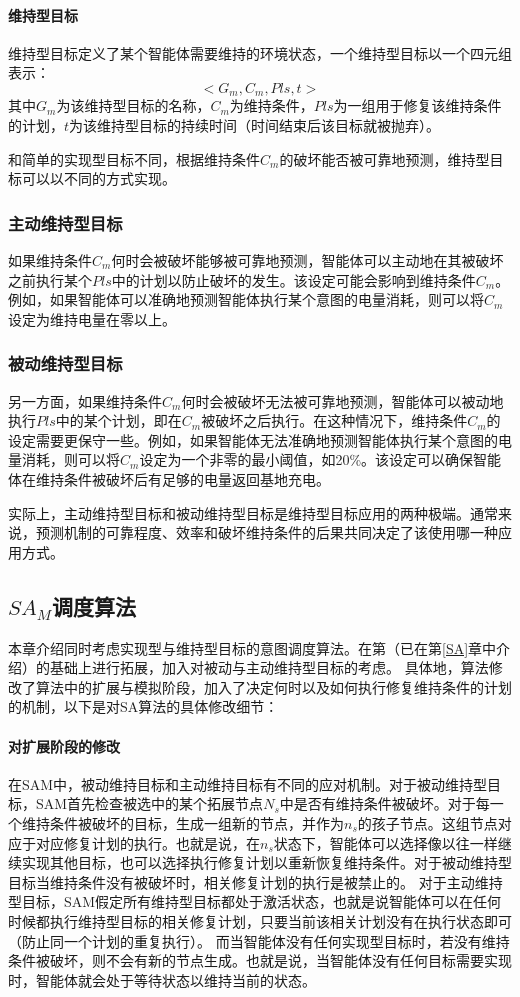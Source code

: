 \paragraph{维持型目标}
维持型目标定义了某个智能体需要维持的环境状态\cite{DBLP:journals/ci/DuffTH14}，一个维持型目标以一个四元组表示：
$$<G_m,C_m,Pls,t>$$
其中$G_m$为该维持型目标的名称，$C_m$为维持条件，$Pls$为一组用于修复该维持条件的计划，$t$为该维持型目标的持续时间（时间结束后该目标就被抛弃）。

和简单的实现型目标不同，根据维持条件$C_m$的破坏能否被可靠地预测，维持型目标可以以不同的方式实现。
\subsubsection{主动维持型目标}
如果维持条件$C_m$何时会被破坏能够被可靠地预测，智能体可以主动地在其被破坏之前执行某个$Pls$中的计划以防止破坏的发生。该设定可能会影响到维持条件$C_m$。例如，如果智能体可以准确地预测智能体执行某个意图的电量消耗，则可以将$C_m$设定为维持电量在零以上。
\subsubsection{被动维持型目标}
另一方面，如果维持条件$C_m$何时会被破坏无法被可靠地预测，智能体可以被动地执行$Pls$中的某个计划，即在$C_m$被破坏之后执行。在这种情况下，维持条件$C_m$的设定需要更保守一些。例如，如果智能体无法准确地预测智能体执行某个意图的电量消耗，则可以将$C_m$设定为一个非零的最小阈值，如20\%。该设定可以确保智能体在维持条件被破坏后有足够的电量返回基地充电。

实际上，主动维持型目标和被动维持型目标是维持型目标应用的两种极端。通常来说，预测机制的可靠程度、效率和破坏维持条件的后果共同决定了该使用哪一种应用方式。


\subsection{$SA_M$调度算法}
本章介绍同时考虑实现型与维持型目标的意图调度算法\SAM 。\SAM 在第\SA （已在第\ref{SA}章中介绍）的基础上进行拓展，加入对被动与主动维持型目标的考虑。
具体地，\SAM 算法修改了\SA 算法中的扩展与模拟阶段，加入了决定何时以及如何执行修复维持条件的计划的机制，以下是对SA算法的具体修改细节：
\paragraph{对扩展阶段的修改}
在SAM中，被动维持目标和主动维持目标有不同的应对机制。对于被动维持型目标，SAM首先检查被选中的某个拓展节点$N_s$中是否有维持条件被破坏。对于每一个维持条件被破坏的目标，生成一组新的节点，并作为$n_s$的孩子节点。这组节点对应于对应修复计划的执行。也就是说，在$n_s$状态下，智能体可以选择像以往一样继续实现其他目标，也可以选择执行修复计划以重新恢复维持条件。对于被动维持型目标当维持条件没有被破坏时，相关修复计划的执行是被禁止的。
对于主动维持型目标，SAM假定所有维持型目标都处于激活状态，也就是说智能体可以在任何时候都执行维持型目标的相关修复计划，只要当前该相关计划没有在执行状态即可（防止同一个计划的重复执行）。
而当智能体没有任何实现型目标时，若没有维持条件被破坏，则不会有新的节点生成。也就是说，当智能体没有任何目标需要实现时，智能体就会处于等待状态以维持当前的状态。

